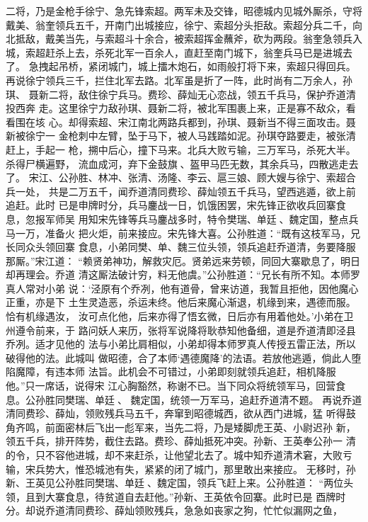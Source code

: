 二将，乃是金枪手徐宁、急先锋索超。两军未及交锋，昭德城内见城外厮杀，守将
戴美、翁奎领兵五千，开南门出城接应，徐宁、索超分头拒敌。索超分兵二千，向
北抵敌，戴美当先，与索超斗十余合，被索超挥金蘸斧，砍为两段。翁奎急领兵入
城，索超赶杀上去，杀死北军一百余人，直赶至南门城下，翁奎兵马已是进城去了。
急拽起吊桥，紧闭城门，城上擂木炮石，如雨般打将下来，索超只得回兵。
再说徐宁领兵三千，拦住北军去路。北军虽是折了一阵，此时尚有二万余人，孙琪、
聂新二将，敌住徐宁兵马。费珍、薛灿无心恋战，领五千兵马，保护乔道清投西奔
走。这里徐宁力敌孙琪、聂新二将，被北军围裹上来，正是寡不敌众，看看围在垓
心。却得索超、宋江南北两路兵都到，孙琪、聂新当不得三面攻击。聂新被徐宁一
金枪刺中左臂，坠于马下，被人马践踏如泥。孙琪夺路要走，被张清赶上，手起一
枪，搠中后心，撞下马来。北兵大败亏输，三万军马，杀死大半。杀得尸横遍野，
流血成河，弃下金鼓旗、盔甲马匹无数，其余兵马，四散逃走去了。
宋江、公孙胜、林冲、张清、汤隆、李云、扈三娘、顾大嫂与徐宁、索超合兵一处，
共是二万五千，闻乔道清同费珍、薛灿领五千兵马，望西逃遁，欲上前追赶。此时
已是申牌时分，兵马鏖战一日，饥饿困罢，宋先锋正欲收兵回寨食息，忽报军师吴
用知宋先锋等兵马鏖战多时，特令樊瑞、单廷、魏定国，整点兵马一万，准备火
把火炬，前来接应。宋先锋大喜。公孙胜道：“既有这枝军马，兄长同众头领回寨
食息，小弟同樊、单、魏三位头领，领兵追赶乔道清，务要降服那厮。”宋江道：
“赖贤弟神功，解救灾厄。贤弟远来劳顿，同回大寨歇息了，明日却再理会。乔道
清这厮法破计穷，料无他虞。”公孙胜道：“兄长有所不知。本师罗真人常对小弟
说：‘泾原有个乔冽，他有道骨，曾来访道，我暂且拒他，因他魔心正重，亦是下
土生灵造恶，杀运未终。他后来魔心渐退，机缘到来，遇德而服。恰有机缘遇汝，
汝可点化他，后来亦得了悟玄微，日后亦有用着他处。’小弟在卫州遵令前来，于
路问妖人来历，张将军说降将耿恭知他备细，道是乔道清即泾县乔冽。适才见他的
法与小弟比肩相似，小弟却得本师罗真人传授五雷正法，所以破得他的法。此城叫
做昭德，合了本师‘遇德魔降’的法语。若放他逃遁，倘此人堕陷魔障，有违本师
法旨。此机会不可错过，小弟即刻就领兵追赶，相机降服他。”只一席话，说得宋
江心胸豁然，称谢不已。当下同众将统领军马，回营食息。公孙胜同樊瑞、单廷、
魏定国，统领一万军马，追赶乔道清不题。
再说乔道清同费珍、薛灿，领败残兵马五千，奔窜到昭德城西，欲从西门进城，猛
听得鼓角齐鸣，前面密林后飞出一彪军来，当先二将，乃是矮脚虎王英、小尉迟孙
新，领五千兵，排开阵势，截住去路。费珍、薛灿抵死冲突。孙新、王英奉公孙一
清的令，只不容他进城，却不来赶杀，让他望北去了。城中知乔道清术窘，大败亏
输，宋兵势大，惟恐城池有失，紧紧的闭了城门，那里敢出来接应。
无移时，孙新、王英见公孙胜同樊瑞、单廷、魏定国，领兵飞赶上来。公孙胜道：
“两位头领，且到大寨食息，待贫道自去赶他。”孙新、王英依令回寨。此时已是
酉牌时分。却说乔道清同费珍、薛灿领败残兵，急急如丧家之狗，忙忙似漏网之鱼，

